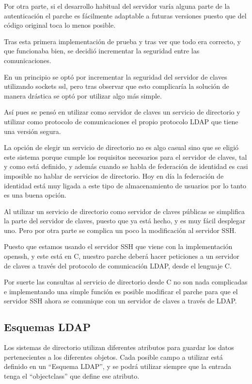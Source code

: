     Por otra parte, si el desarrollo habitual del servidor varía alguna
    parte de la autenticación el parche es fácilmente adaptable a futuras
    versiones puesto que del código original toca lo menos posible.

    Tras esta primera implementación de prueba y tras ver que todo era
    correcto, y que funcionaba bien, se decidió incrementar la seguridad
    entre las comunicaciones.

    En un principio se optó por incrementar la seguridad del servidor de
    claves utilizando sockets ssl, pero tras observar que esto complicaría
    la solución de manera drástica se optó por utilizar algo más simple.

    Así pues se pensó en utilizar como servidor de claves un servicio de
    directorio y utilizar como protocolo de comunicaciones el propio
    protocolo LDAP que tiene una versión segura.

    La opción de elegir un servicio de directorio no es algo casual sino
    que se eligió este sistema porque cumple los requisitos necesarios para
    el servidor de claves, tal y como está definido, y además cuando se
    habla de federación de identidad es casi imposible no hablar de
    servicios de directorio. Hoy en día la federación de identidad está muy
    ligada a este tipo de almacenamiento de usuarios por lo tanto es una
    buena opción.

    Al utilizar un servicio de directorio como servidor de claves públicas
    se simplifica la parte del servidor de claves, puesto que ya está
    hecho, y es muy fácil desplegar uno. Pero por otra parte se complica un
    poco la modificación al servidor SSH.

    Puesto que estamos usando el servidor SSH que viene con la
    implementación openssh, y este está en C, nuestro parche deberá hacer
    peticiones a un servidor de claves a través del protocolo de
    comunicación LDAP, desde el lenguaje C.

    Por suerte las consultas al servicio de directorio desde C no son nada
    complicadas e implementando una simple función es posible modificar el
    parche para que el servidor SSH ahora se comunique con un servidor de
    claves a través de LDAP.

    \subsection{Esquemas LDAP}

    Los sistemas de directorio utilizan diferentes atributos para guardar los
    datos pertenecientes a los diferentes objetos. Cada posible campo a
    utilizar está definido en un ``Esquema LDAP'', y se podrá utilizar
    siempre que la entrada tenga el ``objectclass'' que define ese atributo.

